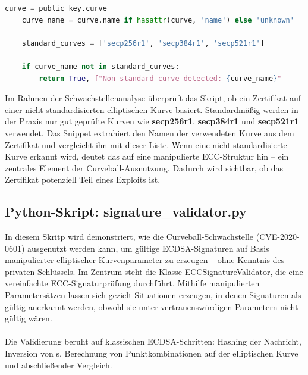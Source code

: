 \documentclass{article}
\begin{document}
\begin{lstlisting}[language=Python,caption={analyze\_ecc\_parameter()-Methode}]
    curve = public_key.curve
    curve_name = curve.name if hasattr(curve, 'name') else 'unknown'

    standard_curves = ['secp256r1', 'secp384r1', 'secp521r1']

    if curve_name not in standard_curves:
        return True, f"Non-standard curve detected: {curve_name}"

\end{lstlisting}
Im Rahmen der Schwachstellenanalyse überprüft das Skript, ob ein Zertifikat auf einer nicht standardisierten elliptischen Kurve basiert. Standardmäßig werden in der Praxis nur gut geprüfte Kurven wie \textbf{secp256r1}, \textbf{secp384r1} und \textbf{secp521r1} verwendet. Das Snippet extrahiert den Namen der verwendeten Kurve aus dem Zertifikat und vergleicht ihn mit dieser Liste. Wenn eine nicht standardisierte Kurve erkannt wird, deutet das auf eine manipulierte ECC-Struktur hin – ein zentrales Element der Curveball-Ausnutzung. Dadurch wird sichtbar, ob das Zertifikat potenziell Teil eines Exploits ist.\\

\subsection{Python-Skript: signature\_validator.py}
In diesem Skritp wird demonstriert, wie die Curveball-Schwachstelle (CVE-2020-0601) ausgenutzt werden kann, um gültige ECDSA-Signaturen auf Basis manipulierter elliptischer Kurvenparameter zu erzeugen – ohne Kenntnis des privaten Schlüssels. Im Zentrum steht die Klasse ECCSignatureValidator, die eine vereinfachte ECC-Signaturprüfung durchführt. Mithilfe manipulierten Parametersätzen lassen sich gezielt Situationen erzeugen, in denen Signaturen als gültig anerkannt werden, obwohl sie unter vertrauenswürdigen Parametern nicht gültig wären.\\
\\
Die Validierung beruht auf klassischen ECDSA-Schritten: Hashing der Nachricht, Inversion von s, Berechnung von Punktkombinationen auf der elliptischen Kurve und abschließender Vergleich.\\
\end{document}
